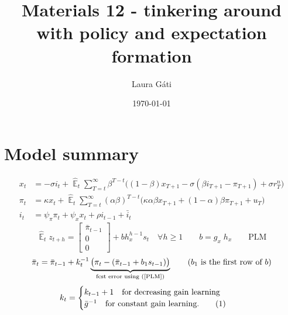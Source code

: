 \documentclass[11pt]{article}
\renewcommand{\[}{\begin{equation}}
\renewcommand{\]}{\end{equation}}
\DeclareMathOperator{\E}{\mathbb{E}}
\newcommand\numberthis{\addtocounter{equation}{1}\tag{\theequation}} %
\begin{document}
\linespread{1.0}

\title{Materials 12 - tinkering around with policy and expectation formation}
\author{Laura G\'ati} 
\date{\today}
\maketitle


\tableofcontents


\newpage
\section{Model summary}
\begin{align}
x_t &=  -\sigma i_t +\hat{\E}_t \sum_{T=t}^{\infty} \beta^{T-t }\big( (1-\beta)x_{T+1} - \sigma(\beta i_{T+1} - \pi_{T+1}) +\sigma r_T^n \big)  \label{prestons18}  \\
\pi_t &= \kappa x_t +\hat{\E}_t \sum_{T=t}^{\infty} (\alpha\beta)^{T-t }\big( \kappa \alpha \beta x_{T+1} + (1-\alpha)\beta \pi_{T+1} + u_T\big) \label{prestons19}  \\
i_t &= \psi_{\pi}\pi_t + \psi_{x} x_t  + \rho i_{t-1} + \bar{i}_t \label{TR}
\end{align}
\begin{equation}
\hat{\E}_t z_{t+h} =  \begin{bmatrix}\bar{\pi}_{t-1} \\ 0 \\ 0 \end{bmatrix}+ bh_x^{h-1}s_t  \quad \forall h\geq 1 \quad \quad b = g_x \; h_x \quad \quad \text{PLM} \label{PLM}
\end{equation}
\begin{equation}
\bar{\pi}_{t} = \bar{\pi}_{t-1} +k_t^{-1}\underbrace{\big(\pi_{t} -(\bar{\pi}_{t-1}+b_1s_{t-1}) \big)}_{\text{fcst error using (\ref{PLM})} } \quad \quad  \text{($b_1$ is the first row of $b$)}
\end{equation}
 \begin{align*}
k_t & = \begin{cases} k_{t-1}+1 \quad \text{for decreasing gain learning}  \\ \bar{g}^{-1}  \quad \text{for constant gain learning.}\numberthis
\end{cases} 
\end{align*}

\newpage
\end{document}
